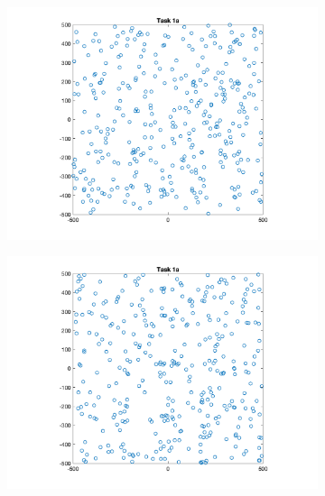 \documentclass[10pt,a4paper]{article}
\begin{document}
	\begin{figure}[h!] %
		\begin{center}
			\begin{subfigure}{0.25\textwidth}
				\includegraphics[width=\textwidth]{screenshot_taskb_10.png}
			\end{subfigure}
			\begin{subfigure}{0.25\textwidth}
				\includegraphics[width=\textwidth]{screenshot_taskb_15.png}
			\end{subfigure}
			\begin{subfigure}{0.25\textwidth}

\end{subfigure}
\end{center}
\end{figure}
\end{document}
